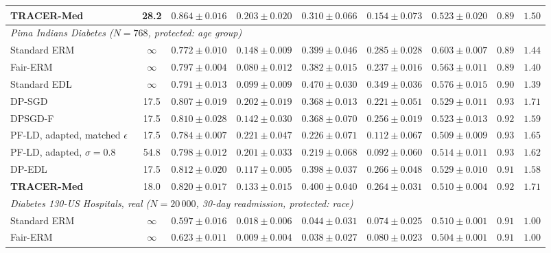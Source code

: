 \documentclass[pdflatex,sn-vancouver-num,referee,lineno]{sn-jnl}
\theoremstyle{thmstyleone}
\theoremstyle{thmstylethree}
\begin{document}
\begin{table}
\begin{tabular}{lcccccccc}
\textbf{TRACER-Med} & 28.2 & $0.864 \pm 0.016$ & $0.203 \pm 0.020$ & $0.310 \pm 0.066$ & $0.154 \pm 0.073$ & $0.523 \pm 0.020$ & $0.89$ & $1.50$ \\
\midrule
\multicolumn{9}{l}{\emph{Pima Indians Diabetes ($N=768$, protected: age group)}} \\
Standard ERM & $\infty$ & $0.772 \pm 0.010$ & $0.148 \pm 0.009$ & $0.399 \pm 0.046$ & $0.285 \pm 0.028$ & $0.603 \pm 0.007$ & $0.89$ & $1.44$ \\
Fair-ERM & $\infty$ & $0.797 \pm 0.004$ & $0.080 \pm 0.012$ & $0.382 \pm 0.015$ & $0.237 \pm 0.016$ & $0.563 \pm 0.011$ & $0.89$ & $1.40$ \\
Standard EDL & $\infty$ & $0.791 \pm 0.013$ & $0.099 \pm 0.009$ & $0.470 \pm 0.030$ & $0.349 \pm 0.036$ & $0.576 \pm 0.015$ & $0.90$ & $1.39$ \\
DP-SGD & 17.5 & $0.807 \pm 0.019$ & $0.202 \pm 0.019$ & $0.368 \pm 0.013$ & $0.221 \pm 0.051$ & $0.529 \pm 0.011$ & $0.93$ & $1.71$ \\
DPSGD-F~\cite{xu2021removing} & 17.5 & $0.810 \pm 0.028$ & $0.142 \pm 0.030$ & $0.368 \pm 0.070$ & $0.256 \pm 0.019$ & $0.523 \pm 0.013$ & $0.92$ & $1.59$ \\
PF-LD, adapted, matched $\epsilon$~\cite{tran2021differentially} & 17.5 & $0.784 \pm 0.007$ & $0.221 \pm 0.047$ & $\mathbf{0.226} \pm \mathbf{0.071}$ & $\mathbf{0.112} \pm \mathbf{0.067}$ & $\mathbf{0.509} \pm \mathbf{0.009}$ & $0.93$ & $1.65$ \\
PF-LD, adapted, $\sigma=0.8$~\cite{tran2021differentially} & 54.8 & $0.798 \pm 0.012$ & $0.201 \pm 0.033$ & $0.219 \pm 0.068$ & $0.092 \pm 0.060$ & $0.514 \pm 0.011$ & $0.93$ & $1.62$ \\
DP-EDL & 17.5 & $0.812 \pm 0.020$ & $\mathbf{0.117} \pm \mathbf{0.005}$ & $0.398 \pm 0.037$ & $0.266 \pm 0.048$ & $0.529 \pm 0.010$ & $0.91$ & $1.58$ \\
\textbf{TRACER-Med} & 18.0 & $\mathbf{0.820} \pm \mathbf{0.017}$ & $0.133 \pm 0.015$ & $0.400 \pm 0.040$ & $0.264 \pm 0.031$ & $0.510 \pm 0.004$ & $0.92$ & $1.71$ \\
\midrule
\multicolumn{9}{l}{\emph{Diabetes 130-US Hospitals, real ($N=20\,000$, 30-day readmission, protected: race)}} \\
Standard ERM & $\infty$ & $0.597 \pm 0.016$ & $0.018 \pm 0.006$ & $0.044 \pm 0.031$ & $0.074 \pm 0.025$ & $0.510 \pm 0.001$ & $0.91$ & $1.00$ \\
Fair-ERM & $\infty$ & $0.623 \pm 0.011$ & $0.009 \pm 0.004$ & $0.038 \pm 0.027$ & $0.080 \pm 0.023$ & $0.504 \pm 0.001$ & $0.91$ & $1.00$ \\

\end{tabular}
\end{table}
\end{document}
